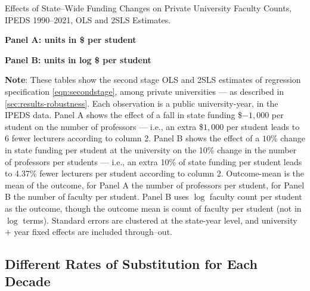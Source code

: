 \begin{table}[H]
    \singlespacing
    \centering
    \caption{Effects of State--Wide Funding Changes on Private University Faculty Counts, IPEDS 1990--2021, OLS and 2SLS Estimates.}

    \textbf{Panel A: units in \$ per student}

    \makebox[\textwidth][c]{}
    
    \textbf{Panel B: units in log \$ per student}
    
    \makebox[\textwidth][c]{}

    \label{tab:facultycount-shock-private-robustness}
    \justify
    \footnotesize
    \textbf{Note}:
    These tables show the second stage OLS and 2SLS estimates of regression specification \eqref{eqn:secondstage}, among private universities --- as described in \autoref{sec:results-robustness}.
    Each observation is a public university-year, in the IPEDS data.
    Panel A shows the effect of a fall in state funding \$$-1,000$ per student on the number of professors --- i.e.,
    an extra \$$1,000$ per student leads to 6 fewer lecturers according to column 2.
    Panel B shows the effect of a $10$\% change in state funding per student at the university on the 10\% change in the number of professors per students --- i.e.,
    an extra 10\% of state funding per student leads to 4.37\% fewer lecturers per student according to column 2.
    Outcome-mean is the mean of the outcome, for Panel A the number of professors per student, for Panel B the number of faculty per student.
    Panel B uses $\log$ faculty count per student as the outcome, though the outcome mean is count of faculty per student (not in $\log$ terms).
    Standard errors are clustered at the state-year level, and university $+$ year fixed effects are included through--out.
\end{table}

\newpage
\subsection{Different Rates of Substitution for Each Decade}
\label{sec:decade-analysis}

